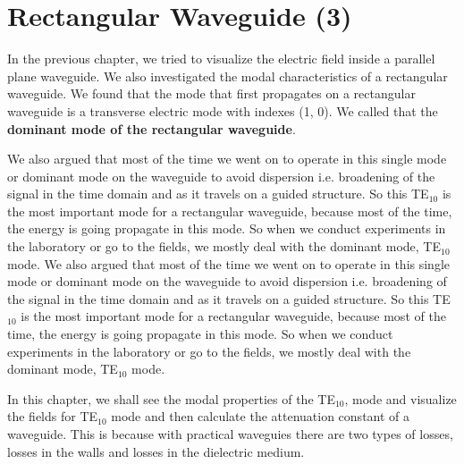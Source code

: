\chapter{Rectangular Waveguide (3)}
In the previous chapter, we tried to visualize the electric field inside a parallel plane waveguide. We also investigated the modal characteristics of a rectangular waveguide. We found that the mode that first propagates on a rectangular waveguide is a transverse electric mode with indexes (1, 0). We called that the \textbf{dominant mode of the rectangular waveguide}. 
	
We also argued that most of the time we went on to operate in this single mode or dominant mode on the waveguide to avoid dispersion i.e. broadening of the signal in the time domain and as it travels on a guided structure. So this TE$_{10}$  is the most important mode for a rectangular waveguide, because most of the time, the energy is going propagate in this mode. So when we conduct experiments in the laboratory or go to the fields, we mostly deal with the dominant mode,  TE$_{10}$ mode.
We also argued that most of the time we went on to operate in this single mode or dominant mode on the waveguide to avoid dispersion i.e. broadening of the signal in the time domain and as it travels on a guided structure. So this TE$_{10}$  is the most important mode for a rectangular waveguide, because most of the time, the energy is going propagate in this mode. So when we conduct experiments in the laboratory or go to the fields, we mostly deal with the dominant mode,  TE$_{10}$ mode.

In this chapter, we shall see the modal properties of the TE$_{10}$, mode and visualize the fields for TE$_{10}$ mode and then calculate the attenuation constant of a waveguide. This is because with practical waveguies there are two types of losses, losses in the walls and losses in the dielectric medium.

